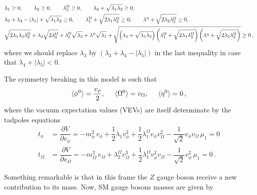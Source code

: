 \documentclass[12pt,letterpaper]{article}
\begin{document}
\begin{align}
\label{eq:co-positivity}
&\lambda_1 \geq 0,\hspace{0.7 cm}  
\lambda_2 \geq 0,\hspace{0.7 cm} 
\lambda_2^{\Omega} \geq 0, \hspace{0.7 cm} 
\lambda_3+\sqrt{\lambda_1\lambda_2}\geq 0,\nonumber \\
&\lambda_3+\lambda_4-|\lambda_5|+\sqrt{\lambda_1\lambda_2}\geq 0,\hspace{0.7 cm} 
\lambda_1^{\Omega}+\sqrt{2\lambda_1\lambda_2^{\Omega}}\geq 0,\hspace{0.7 cm} 
\lambda^{\eta}+\sqrt{2\lambda_2\lambda_2^{\Omega}}\geq 0,\nonumber\\
&\sqrt{2\lambda_1\lambda_2\lambda_2^{\Omega}}+\lambda_3\sqrt{2\lambda_2^{\Omega}}
+\lambda_1^{\Omega}\sqrt{\lambda_2}
+\lambda^{\eta}\sqrt{\lambda_1}
+\sqrt{\left(\lambda_3+\sqrt{\lambda_1\lambda_2}\right)
\left(\lambda_1^{\Omega}+\sqrt{2\lambda_1\lambda_2^{\Omega}}\right)
\left(\lambda^{\eta}+\sqrt{2\lambda_2\lambda_2^{\Omega}}\right)}\geq 0\,,
\end{align}
where we should replace $\lambda_3$ by $(\lambda_3+\lambda_4-|\lambda_5|)$ in the last inequality in case that $\lambda_4+|\lambda_5|<0$.

The symmetry breaking in this model is such that 
\begin{align}
\label{eq:VEVs}
\langle \phi^0\rangle = \dfrac{v_{\phi}}{2},\hspace{0.5 cm} \langle \Omega^0 \rangle = v_{\Omega},\hspace{0.5 cm} \langle \eta^0 \rangle=0\,,
\end{align}
where the vacuum expectation values (VEVs) are itself determinate by the tadpoles equations
\begin{align}
\label{eq:tadpole-phi}
t_{\phi}&=\dfrac{\partial V}{\partial v_{\phi}} = 
-m_{\phi}^2\,v_{\phi}+\dfrac{1}{2}\lambda_1v_{\phi}^3+ \dfrac{1}{2}\lambda_1^{\Omega}v_{\phi}v_{\Omega}^2-\dfrac{1}{\sqrt{2}}v_{\phi}v_{\Omega}\,\mu_1 =0  \\
\label{eq:tadpole-Omega}
t_{\Omega}&=\dfrac{\partial V}{\partial v_{\Omega}} = 
-m_{\Omega}^2\,v_{\Omega}+\lambda_2^{\Omega}v_{\Omega}^3+ \dfrac{1}{2}\lambda_1^{\Omega}v_{\phi}^2v_{\Omega}-\dfrac{1}{\sqrt{2}}v_{\phi}^2\,\mu_1 =0\,.
\end{align}

Something remarkable is that in this frame the $Z$ gauge boson receive a new contribution to its mass. Now, SM gauge bosons masses are given by
\end{document}
